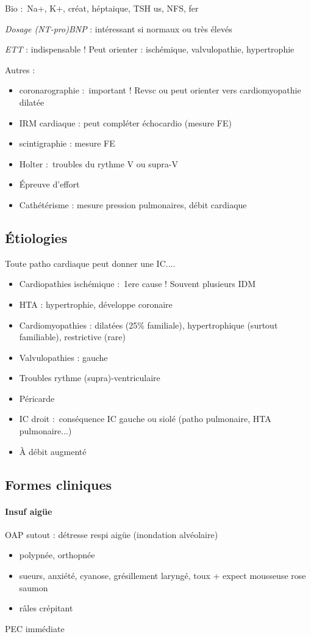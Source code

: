 \documentclass{article}
\begin{document}
Bio : Na+, K+, créat, héptaique, TSH us, NFS, fer

\textit{Dosage (NT-pro)BNP}  : intéressant si normaux ou très élevés

\textit{ETT} : indispensable ! Peut orienter : ischémique, valvulopathie,
hypertrophie

Autres :
\begin{itemize}
  \item coronarographie : important ! Revsc ou peut orienter vers cardiomyopathie
    dilatée
  \item IRM cardiaque : peut compléter échocardio (mesure FE)
  \item scintigraphie : mesure FE
  \item Holter : troubles du rythme V ou supra-V
  \item Épreuve d'effort
  \item Cathétérisme : mesure pression pulmonaires, débit cardiaque
\end{itemize}

\subsection{Étiologies}
Toute patho cardiaque peut donner une IC....

\begin{itemize}
  \item Cardiopathies ischémique : 1ere cause ! Souvent plusieurs IDM
  \item HTA : hypertrophie, développe coronaire
  \item Cardiomyopathies : dilatées (25\% familiale), hypertrophique (surtout
    familiable), restrictive (rare)
  \item Valvulopathies : gauche
  \item Troubles rythme (supra)-ventriculaire
  \item Péricarde
  \item IC droit : conséquence IC gauche ou siolé (patho pulmonaire, HTA
    pulmonaire...)
  \item À débit augmenté
\end{itemize}

\subsection{Formes cliniques}
\paragraph{ Insuf aigüe}
OAP sutout : détresse respi aigüe (inondation alvéolaire) 
\begin{itemize}
  \item polypnée, orthopnée
  \item sueurs, anxiété, cyanose, grésillement laryngé, toux + expect mousseuse
    rose saumon
  \item râles crépitant
\end{itemize}
\thus PEC immédiate \skull
   
\end{document}
